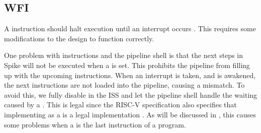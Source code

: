 %
%


\subsection{WFI}
\label{sec:wfi}

A  instruction should halt execution until an interrupt occurs \cite{watermanRISCVInstructionSet2021}. This requires some modifications to the design to function correctly.

One problem with  instructions and the pipeline shell is that the next steps in Spike will not be executed when a  is set. This prohibits the pipeline from filling up with the upcoming instructions. When an interrupt is taken, and  is awakened, the next instructions are not loaded into the pipeline, causing a mismatch. To avoid this, we fully disable  in the ISS and let the pipeline shell handle the waiting caused by a . This is legal since the RISC-V specification also specifies that implementing  as a  is a legal implementation \cite{watermanRISCVInstructionSet2021}. As will be discussed in , this causes some problems when a  is the last instruction of a program.


%


